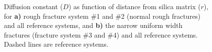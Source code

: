 \begin{figure}[htpb]%
\setlength{\myfigwidth}{0.58\textwidth}%
\makebox[\textwidth][c]{ %
    \begin{minipage}[t]{\myfigwidth}%
        \centering%
        \subcaption{\label{fig:diffusion_normal_and_reference}}%
    \end{minipage}%
    \hfill%
    \begin{minipage}[t]{\myfigwidth}%
        \centering%
        \subcaption{\label{fig:diffusion_narrow_and_reference}}%
    \end{minipage}%
}%
\caption{%
    Diffusion constant ($D$) as function of distance from silica matrix ($r$), for \textbf{a)} rough fracture system \#1 and \#2 (normal rough fractures) and all reference systems, and \textbf{b)} the narrow uniform width fractures (fracture system \#3 and \#4) and all reference systems. Dashed lines are reference systems. %
    \label{fig:last_diffusion_figure}%
}%
\end{figure}%

% 


